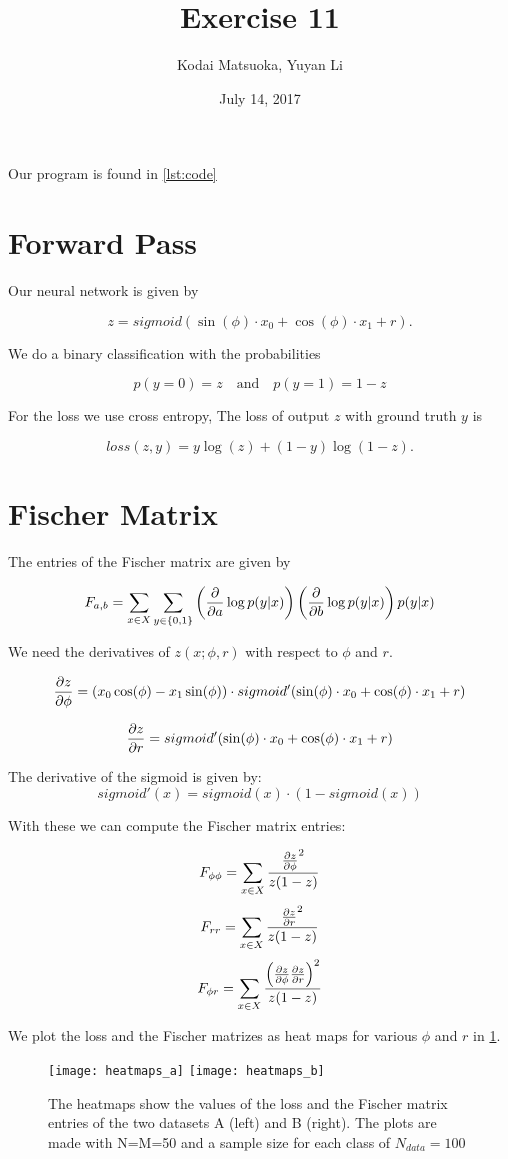 \documentclass[12pt]{scrartcl}
\author{Kodai Matsuoka, Yuyan Li}
\title{Exercise 11}
\date{July 14, 2017}
\begin{document}
\maketitle

Our program is found in \cref{lst:code}

\section{Forward Pass}

Our neural network is given by

\[
  z = sigmoid(\sin(\phi) \cdot x_0 + \cos(\phi) \cdot x_1 + r).
\]

We do a binary classification with the probabilities

\[ p(y=0)=z \quad \text{and} \quad p(y=1)=1-z \]

For the loss we use cross entropy, The loss of output $z$ with ground truth $y$ is

\[
  loss(z,y) = y \log(z) + (1 - y) \log(1-z).
\]


\section{Fischer Matrix}

The entries of the Fischer matrix are given by

\[
  F_{a,b} = \sum_{x \in X} \sum_{y \in \{0,1\}} \left( \pdv{}{a} \log p(y|x) \right) \left( \pdv{}{b} \log p(y|x) \right) p(y|x)
\]

We need the derivatives of $z(x;\phi,r)$ with respect to $\phi$ and $r$.

\[
  \pdv{z}{\phi} = \left( x_0 \cos(\phi) - x_1 \sin(\phi) \right) \cdot sigmoid'(\sin(\phi) \cdot x_0 + \cos(\phi) \cdot x_1 + r)
\]

\[
  \pdv{z}{r} = sigmoid'(\sin(\phi) \cdot x_0 + \cos(\phi) \cdot x_1 + r)
\]

The derivative of the sigmoid is given by:
\[
  sigmoid'(x) = sigmoid(x) \cdot (1 - sigmoid(x))
\]

With these we can compute the Fischer matrix entries:

\[
  F_{\phi \phi} = \sum_{x \in X} \frac{\pdv{z}{\phi}^2}{z(1-z)}
\]
\[
  F_{rr} = \sum_{x \in X} \frac{\pdv{z}{r}^2}{z(1-z)}
\]
\[
  F_{\phi r} = \sum_{x \in X} \frac{\left( \pdv{z}{\phi} \pdv{z}{r} \right)^2}{z(1-z)}
\]

We plot the loss and the Fischer matrizes as heat maps for various $\phi$ and $r$ in \cref{fig:hm}.

\begin{figure}[h]
  \centering
  \texttt{[image: heatmaps\_a]}
  \texttt{[image: heatmaps\_b]}
  \caption{The heatmaps show the values of the loss and the Fischer matrix entries of the two datasets A (left) and B (right). The plots are made with N=M=50 and a sample size for each class of $N_{data}=100$}
  \label{fig:hm}
\end{figure}


\clearpage

\end{document}
